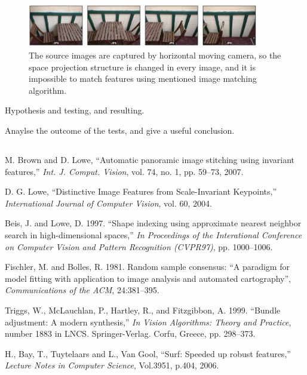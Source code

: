 \documentclass[10pt,twocolumn,letterpaper]{article}
\begin{document}
\begin{figure}
    \begin{center}
        \includegraphics[width=0.9\textwidth]{horizontal_motion}
    \end{center}
    \caption{The source images are captured by horizontal moving camera, so the space projection structure is changed in every image,
    and it is impossible to match features using mentioned image matching algorithm.}
    \label{fig:cameramotion}
\end{figure}


Hypothesis and testing, and resulting.

Anaylse the outcome of the tests, and give a useful conclusion.

\subsection{}


\begin{thebibliography}{9}
M. Brown and D. Lowe, ``Automatic panoramic image stitching using invariant features,''
\textit{Int. J. Comput. Vision}, vol. 74, no. 1, pp. 59–73, 2007.

D. G. Lowe, ``Distinctive Image Features from Scale-Invariant Keypoints,''
\textit{International Journal of Computer Vision}, vol. 60, 2004.

Beis, J. and Lowe, D. 1997. ``Shape indexing using approximate nearest neighbor search in high-dimensional spaces,''
\textit{In Proceedings of the Interational Conference on Computer Vision and Pattern Recognition (CVPR97)}, pp. 1000–1006.

Fischler, M. and Bolles, R. 1981. Random sample consensus: ``A paradigm for model fitting with application to image analysis and automated cartography'',
\textit{Communications of the ACM}, 24:381–395.

Triggs, W., McLauchlan, P., Hartley, R., and Fitzgibbon, A. 1999. ``Bundle adjustment: A modern synthesis,''
\textit{In Vision Algorithms: Theory and Practice}, number 1883 in LNCS. Springer-Verlag. Corfu, Greece, pp. 298–373.

H., Bay, T., Tuytelaars and L., Van Gool, ``Surf: Speeded up robust features,''
\textit{Lecture Notes in Computer Science}, Vol.3951, p.404, 2006.

\end{thebibliography}
\end{document}
